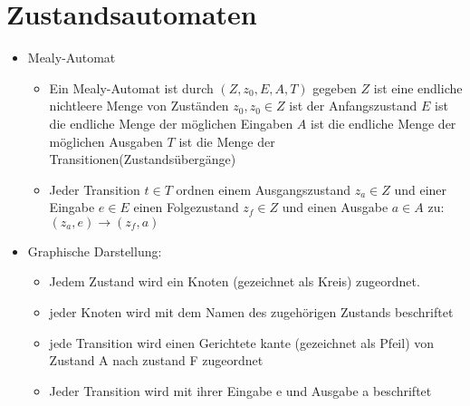 \documentclass[10pt,a5paper]{article}
\begin{document}
\section{Zustandsautomaten}
\begin{itemize}
\item Mealy-Automat\begin{itemize}
\item Ein Mealy-Automat ist durch \ensuremath{(Z,z_0,E,A,T)} gegeben
\subitem \ensuremath{Z} ist eine endliche nichtleere Menge von Zuständen
\subitem \ensuremath{z_0, z_0\in Z} ist der Anfangszustand
\subitem \ensuremath{E} ist die endliche Menge der möglichen Eingaben
\subitem \ensuremath{A} ist die endliche Menge der möglichen Ausgaben
\subitem \ensuremath{T} ist die Menge der Transitionen(Zustandsübergänge)
\item Jeder Transition \ensuremath{t\in T} ordnen einem Ausgangszustand \ensuremath{z_a\in Z} und einer Eingabe \ensuremath{e\in E} einen Folgezustand \ensuremath{z_f \in Z} und einen Ausgabe \ensuremath{a\in A} zu:\ensuremath{(z_a,e)\to (z_f,a)}
\end{itemize}
\item Graphische Darstellung:\begin{itemize}
\item Jedem Zustand wird ein Knoten (gezeichnet als Kreis) zugeordnet.
\item jeder Knoten wird mit dem Namen des zugehörigen Zustands beschriftet
\item jede Transition wird einen Gerichtete kante (gezeichnet als Pfeil) von Zustand A nach zustand F zugeordnet
\item Jeder Transition wird mit ihrer Eingabe e und Ausgabe a beschriftet
\end{itemize}
\end{itemize}
\end{document}
